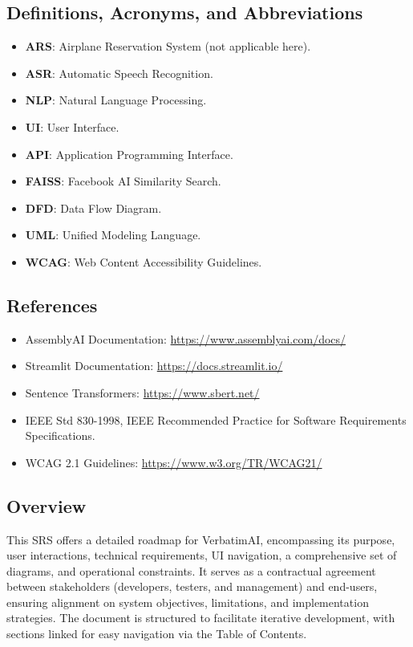 \documentclass[12pt]{article}
\begin{document}
\subsection{Definitions, Acronyms, and Abbreviations}
\begin{itemize}
    \item \textbf{ARS}: Airplane Reservation System (not applicable here).
    \item \textbf{ASR}: Automatic Speech Recognition.
    \item \textbf{NLP}: Natural Language Processing.
    \item \textbf{UI}: User Interface.
    \item \textbf{API}: Application Programming Interface.
    \item \textbf{FAISS}: Facebook AI Similarity Search.
    \item \textbf{DFD}: Data Flow Diagram.
    \item \textbf{UML}: Unified Modeling Language.
    \item \textbf{WCAG}: Web Content Accessibility Guidelines.
\end{itemize}

\subsection{References}
\begin{itemize}
    \item AssemblyAI Documentation: \url{https://www.assemblyai.com/docs/}
    \item Streamlit Documentation: \url{https://docs.streamlit.io/}
    \item Sentence Transformers: \url{https://www.sbert.net/}
    \item IEEE Std 830-1998, IEEE Recommended Practice for Software Requirements Specifications.
    \item WCAG 2.1 Guidelines: \url{https://www.w3.org/TR/WCAG21/}
\end{itemize}

\subsection{Overview}
This SRS offers a detailed roadmap for VerbatimAI, encompassing its purpose, user interactions, technical requirements, UI navigation, a comprehensive set of diagrams, and operational constraints. It serves as a contractual agreement between stakeholders (developers, testers, and management) and end-users, ensuring alignment on system objectives, limitations, and implementation strategies. The document is structured to facilitate iterative development, with sections linked for easy navigation via the Table of Contents.
\end{document}
